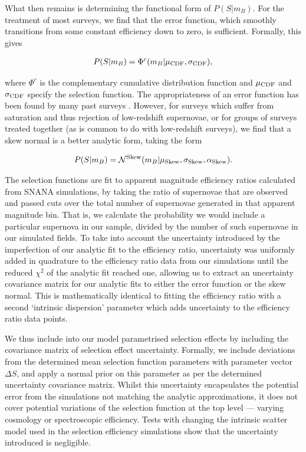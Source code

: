 \documentclass[a4paper,fleqn,usenatbib]{mnras}
\newcommand{\green}{\color{forestgreen}}
\begin{document}
What then remains is determining the functional form of $P(S|m_B)$. For the treatment of most surveys, we find that the error function, which smoothly transitions from some constant efficiency down to zero, is sufficient. Formally, this gives

\begin{align}
P(S|m_B) = \Phi^c(m_B | \mu_{\rm CDF}, \sigma_{\rm CDF}),
\end{align}

where $\Phi^c$ is the complementary cumulative distribution function and $\mu_{\rm CDF}$ and $\sigma_{\rm CDF}$ specify the selection function. The appropriateness of an error function has been found by many past surveys \citep{Dilday2008, Barbary2010, Perrett2012, Graur2013, Rodney2014}. However, for surveys which suffer from saturation and thus rejection of low-redshift supernovae, or for groups of surveys treated together (as is common to do with low-redshift surveys), we find that a skew normal is a better analytic form, taking the form

\begin{align}
P(S|m_B) = \mathcal{N}^{{\rm Skew}}(m_B | \mu_{\rm Skew}, \sigma_{\rm Skew}, \alpha_{\rm Skew}).
\end{align}


The selection functions are fit to apparent magnitude efficiency ratios calculated from SNANA simulations, by {\green taking the ratio of supernovae that are observed and passed cuts over the total number of supernovae generated in that apparent magnitude bin}. That is, we calculate the probability we would include a particular supernova in our sample, divided by the number of such supernovae in our simulated fields. To take into account the uncertainty introduced by the imperfection of our analytic fit to the efficiency ratio, uncertainty was uniformly added in quadrature to the efficiency ratio data from our simulations until the reduced $\chi^2$ of the analytic fit reached one, allowing us to extract an uncertainty covariance matrix for our analytic fits to either the error function or the skew normal. This is mathematically identical to fitting the efficiency ratio with a second `intrinsic dispersion' parameter which adds uncertainty to the efficiency ratio data points.

We thus include into our model parametrised selection effects by including the covariance matrix of selection effect uncertainty. Formally, we include deviations from the determined mean selection function parameters with parameter vector $\Delta S$, and apply a normal prior on this parameter as per the determined uncertainty covariance matrix.  Whilst this uncertainty encapsulates the potential error from the simulations not matching the analytic approximations, it does not cover potential variations of the selection function at the top level --- varying cosmology or spectroscopic efficiency. Tests with changing the intrinsic scatter model used in the selection efficiency simulations show that the uncertainty introduced is negligible.
\end{document}
